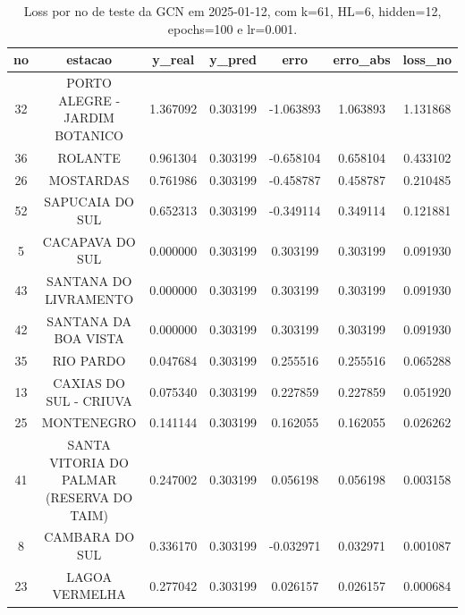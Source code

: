 \begin{table}[h]
\centering
\caption{Loss por no de teste da GCN em 2025-01-12, com k=61, HL=6, hidden=12, epochs=100 e lr=0.001.}
\label{tab:gcn_loss_k61_hl6_h12_e100_d20250112}
\begin{tabular}{ccccccc}
\toprule
no & estacao & y\_real & y\_pred & erro & erro\_abs & loss\_no \\
\midrule
32 & PORTO ALEGRE - JARDIM BOTANICO & 1.367092 & 0.303199 & -1.063893 & 1.063893 & 1.131868 \\
36 & ROLANTE & 0.961304 & 0.303199 & -0.658104 & 0.658104 & 0.433102 \\
26 & MOSTARDAS & 0.761986 & 0.303199 & -0.458787 & 0.458787 & 0.210485 \\
52 & SAPUCAIA DO SUL & 0.652313 & 0.303199 & -0.349114 & 0.349114 & 0.121881 \\
5 & CACAPAVA DO SUL & 0.000000 & 0.303199 & 0.303199 & 0.303199 & 0.091930 \\
43 & SANTANA DO LIVRAMENTO & 0.000000 & 0.303199 & 0.303199 & 0.303199 & 0.091930 \\
42 & SANTANA DA BOA VISTA & 0.000000 & 0.303199 & 0.303199 & 0.303199 & 0.091930 \\
35 & RIO PARDO & 0.047684 & 0.303199 & 0.255516 & 0.255516 & 0.065288 \\
13 & CAXIAS DO SUL - CRIUVA & 0.075340 & 0.303199 & 0.227859 & 0.227859 & 0.051920 \\
25 & MONTENEGRO & 0.141144 & 0.303199 & 0.162055 & 0.162055 & 0.026262 \\
41 & SANTA VITORIA DO PALMAR (RESERVA DO TAIM) & 0.247002 & 0.303199 & 0.056198 & 0.056198 & 0.003158 \\
8 & CAMBARA DO SUL & 0.336170 & 0.303199 & -0.032971 & 0.032971 & 0.001087 \\
23 & LAGOA VERMELHA & 0.277042 & 0.303199 & 0.026157 & 0.026157 & 0.000684 \\
\bottomrule
\end{tabular}
\end{table}
